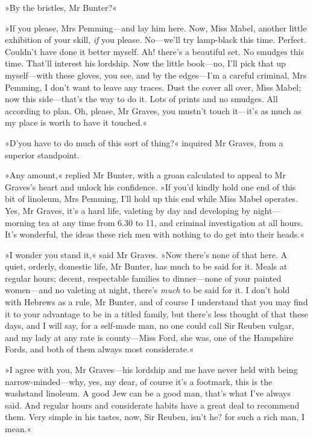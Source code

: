 »By the bristles, Mr Bunter?«

»If you please, Mrs Pemming\allowbreak---\allowbreak and lay him here. Now, Miss Mabel, another little exhibition of your skill, \textit{if} you please. No\allowbreak---\allowbreak we'll try lamp-black this time. Perfect. Couldn't have done it better myself. Ah! there's a beautiful set. No smudges this time. That'll interest his lordship. Now the little book\allowbreak---\allowbreak no, I'll pick that up myself\allowbreak---\allowbreak with these gloves, you see, and by the edges\allowbreak---\allowbreak I'm a careful criminal, Mrs Pemming, I don't want to leave any traces. Dust the cover all over, Miss Mabel; now this side\allowbreak---\allowbreak that's the way to do it. Lots of prints and no smudges. All according to plan. Oh, please, Mr Graves, you mustn't touch it\allowbreak---\allowbreak it's as much as my place is worth to have it touched.«

»D'you have to do much of this sort of thing?« inquired Mr Graves, from a superior standpoint.

»Any amount,« replied Mr Bunter, with a groan calculated to appeal to Mr Graves's heart and unlock his confidence. »If you'd kindly hold one end of this bit of linoleum, Mrs Pemming, I'll hold up this end while Miss Mabel operates. Yes, Mr Graves, it's a hard life, valeting by day and developing by night\allowbreak---\allowbreak morning tea at any time from 6.30 to 11, and criminal investigation at all hours. It's wonderful, the ideas these rich men with nothing to do get into their heads.«

»I wonder you stand it,« said Mr Graves. »Now there's none of that here. A quiet, orderly, domestic life, Mr Bunter, has much to be said for it. Meals at regular hours; decent, respectable families to dinner\allowbreak---\allowbreak none of your painted women\allowbreak---\allowbreak and no valeting at night, there's \textit{much} to be said for it. I don't hold with Hebrews as a rule, Mr Bunter, and of course I understand that you may find it to your advantage to be in a titled family, but there's less thought of that these days, and I will say, for a self-made man, no one could call Sir Reuben vulgar, and my lady at any rate is county\allowbreak---\allowbreak Miss Ford, she was, one of the Hampshire Fords, and both of them always most considerate.«

»I agree with you, Mr Graves\allowbreak---\allowbreak his lordship and me have never held with being narrow-minded\allowbreak---\allowbreak why, yes, my dear, of course it's a footmark, this is the washstand linoleum. A good Jew can be a good man, that's what I've always said. And regular hours and considerate habits have a great deal to recommend them. Very simple in his tastes, now, Sir Reuben, isn't he? for such a rich man, I mean.«

